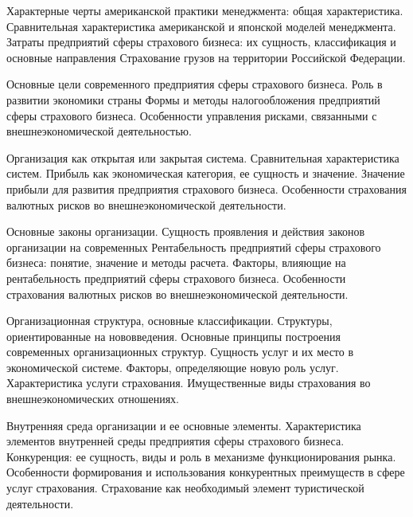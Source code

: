 \documentclass[
	11pt,
	a4paper,
	]
	{article}
\begin{document}
\bigskip

\noindent{} 
	{
		Характерные черты американской практики менеджмента: общая характеристика. Сравнительная характеристика американской и японской моделей менеджмента.
	}{
		Затраты предприятий сферы страхового бизнеса: их сущность, классификация и основные направления
	}{
		Страхование грузов на территории Российской Федерации.
	}

\bigskip

\noindent{} 
	{
		Основные цели современного предприятия сферы страхового бизнеса. Роль в развитии экономики страны
	}{
		Формы и методы налогообложения предприятий сферы страхового бизнеса.
	}{
		Особенности управления рисками, связанными с внешнеэкономической деятельностью.
	}

\bigskip

\noindent{} 
	{
		Организация как открытая или закрытая система. Сравнительная характеристика систем.
	}{
		Прибыль как экономическая категория, ее сущность и значение. Значение прибыли для развития предприятия страхового бизнеса.
	}{
		Особенности страхования валютных рисков во внешнеэкономической деятельности.
	}

\bigskip

\noindent{} 
	{
		Основные законы организации. Сущность проявления и действия законов организации на современных
	}{
		Рентабельность предприятий сферы страхового бизнеса: понятие, значение и методы расчета. Факторы, влияющие на рентабельность предприятий сферы страхового бизнеса.
	}{
		Особенности страхования валютных рисков во внешнеэкономической деятельности.
	}

\bigskip

\noindent{} 
	{
		Организационная структура, основные классификации. Структуры, ориентированные на нововведения. Основные принципы построения современных организационных структур.
	}{
		Сущность услуг и их место в экономической системе. Факторы, определяющие новую роль услуг. Характеристика услуги страхования.
	}{
		Имущественные виды страхования во внешнеэкономических отношениях.
	}

\bigskip

\noindent{} 
	{
		Внутренняя среда организации и ее основные элементы. Характеристика элементов внутренней среды предприятия сферы страхового бизнеса.
	}{
		Конкуренция: ее сущность, виды и роль в механизме функционирования рынка. Особенности формирования и использования конкурентных преимуществ в сфере услуг страхования.
	}{
		Страхование как необходимый элемент туристической деятельности.
	}
\end{document}
